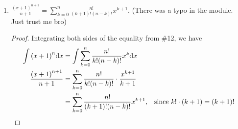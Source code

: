 \documentclass{article}
\begin{document}
\begin{enumerate}
\begin{minipage}[t]{.14\textwidth}
    \end{minipage}%
    \par
    \begin{proof} 
        Differentiating both sides of the equality from \#12, we have\begin{align} 
            \frac{\mathrm{d}}{\mathrm{d}x} \bigl[ {(x+1)}^n \bigr] &= \frac{\mathrm{d}}{\mathrm{d}x} \Bigg[ \sum_{k=0}^{n} \frac{n!}{k!(n-k)!} x^k \Bigg] \notag \\ 
            n{(x+1)}^{n-1} &= \sum_{k=1}^n \frac{n!}{k!(n-k)!} kx^{k-1} \notag &\text{since the first term becomes 0} \\
            & = \sum_{k=1}^n \frac{n!k}{k(k-1)!(n-k)!} x^{k-1} \notag &\text{since}~k! = k \cdot (k-1)! \\ 
            & = \sum_{k=1}^n \frac{n!}{(k-1)!(n-k)!} x^{k-1}, \notag &\text{cancelling}
        \end{align} which is equal to the right-hand side. 
    \end{proof} 
    \item $\displaystyle \frac{{(x+1)}^{n+1}}{n+1} = \sum_{k=0}^{n} \frac{n!}{(k+1)!(n-k)!} x^{k+1}$. (There was a typo in the module. Just trust me bro)\begin{proof} 
        Integrating both sides of the equality from \#12, we have\begin{align} 
            \int {(x+1)}^n \mathrm{d}x &= \int \sum_{k=0}^n \frac{n!}{k!(n-k)!} x^k \mathrm{d}x \notag \\ 
            \frac{{(x+1)}^{n+1}}{n+1} &= \sum_{k=0}^n \frac{n!}{k!(n-k)!} \cdot \frac{x^{k+1}}{k+1} \notag \\ 
            &= \sum_{k=0}^n \frac{n!}{(k+1)!(n-k)!} x^{k+1}, \notag &\text{since}~k! \cdot (k+1) = (k+1)!

\end{align}
\end{proof}
\end{enumerate}
\end{document}
